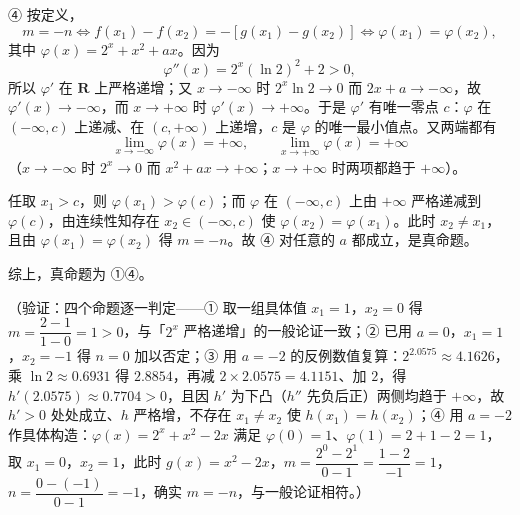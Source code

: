 \begin{answer}
④ 按定义，
\nopagebreak[4]
\[
m=-n\iff f(x_1)-f(x_2)=-\left[g(x_1)-g(x_2)\right]\iff\varphi(x_1)=\varphi(x_2),
\]
其中 \(\varphi(x)=2^x+x^2+ax\)。因为
\nopagebreak[4]
\[
\varphi''(x)=2^x(\ln2)^2+2>0,
\]
所以 \(\varphi'\) 在 \(\mathbf{R}\) 上严格递增；又 \(x\to-\infty\) 时 \(2^x\ln2\to0\) 而 \(2x+a\to-\infty\)，故 \(\varphi'(x)\to-\infty\)，而 \(x\to+\infty\) 时 \(\varphi'(x)\to+\infty\)。于是 \(\varphi'\) 有唯一零点 \(c\)：\(\varphi\) 在 \((-\infty,c)\) 上递减、在 \((c,+\infty)\) 上递增，\(c\) 是 \(\varphi\) 的唯一最小值点。又两端都有
\nopagebreak[4]
\[
\lim_{x\to-\infty}\varphi(x)=+\infty,\qquad\lim_{x\to+\infty}\varphi(x)=+\infty
\]
（\(x\to-\infty\) 时 \(2^x\to0\) 而 \(x^2+ax\to+\infty\)；\(x\to+\infty\) 时两项都趋于 \(+\infty\)）。

任取 \(x_1>c\)，则 \(\varphi(x_1)>\varphi(c)\)；而 \(\varphi\) 在 \((-\infty,c)\) 上由 \(+\infty\) 严格递减到 \(\varphi(c)\)，由连续性知存在 \(x_2\in(-\infty,c)\) 使 \(\varphi(x_2)=\varphi(x_1)\)。此时 \(x_2\ne x_1\)，且由 \(\varphi(x_1)=\varphi(x_2)\) 得 \(m=-n\)。故 ④ 对任意的 \(a\) 都成立，是真命题。

综上，真命题为 ①④。

（验证：四个命题逐一判定——① 取一组具体值 \(x_1=1\)，\(x_2=0\) 得 \(m=\dfrac{2-1}{1-0}=1>0\)，与「\(2^x\) 严格递增」的一般论证一致；② 已用 \(a=0\)，\(x_1=1\)，\(x_2=-1\) 得 \(n=0\) 加以否定；③ 用 \(a=-2\) 的反例数值复算：\(2^{2.0575}\approx4.1626\)，乘 \(\ln2\approx0.6931\) 得 \(2.8854\)，再减 \(2\times2.0575=4.1151\)、加 \(2\)，得 \(h'(2.0575)\approx0.7704>0\)，且因 \(h'\) 为下凸（\(h''\) 先负后正）两侧均趋于 \(+\infty\)，故 \(h'>0\) 处处成立、\(h\) 严格增，不存在 \(x_1\ne x_2\) 使 \(h(x_1)=h(x_2)\)；④ 用 \(a=-2\) 作具体构造：\(\varphi(x)=2^x+x^2-2x\) 满足 \(\varphi(0)=1\)、\(\varphi(1)=2+1-2=1\)，取 \(x_1=0\)，\(x_2=1\)，此时 \(g(x)=x^2-2x\)，\(m=\dfrac{2^0-2^1}{0-1}=\dfrac{1-2}{-1}=1\)，\(n=\dfrac{0-(-1)}{0-1}=-1\)，确实 \(m=-n\)，与一般论证相符。）


\end{answer}
